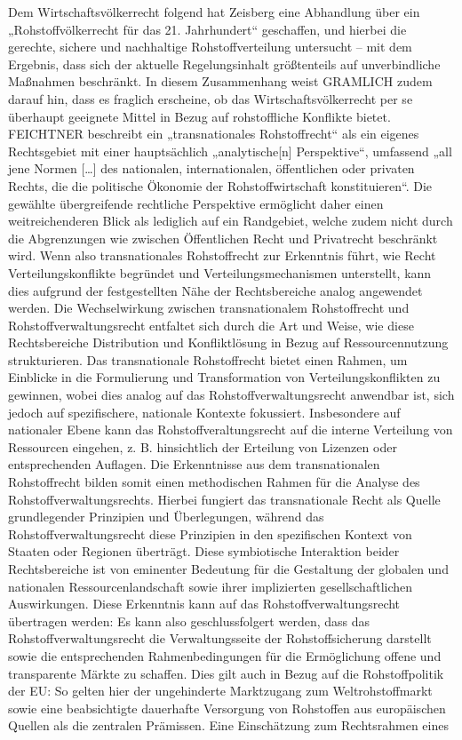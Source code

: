 \documentclass[12pt,a4paper,oneside]{book} %
\begin{document}
Dem Wirtschaftsvölkerrecht folgend hat Zeisberg eine Abhandlung über ein „Rohstoffvölkerrecht für das 21. Jahrhundert“ geschaffen,\autocite{zeisberg_rohstoffvolkerrecht_2021} und hierbei die gerechte, sichere und nachhaltige Rohstoffverteilung untersucht – mit dem Ergebnis, dass sich der aktuelle Regelungsinhalt größtenteils auf unverbindliche Maßnahmen beschränkt. In diesem Zusammenhang weist GRAMLICH zudem darauf hin, dass es fraglich erscheine, ob das Wirtschaftsvölkerrecht per se überhaupt geeignete Mittel in Bezug auf rohstoffliche Konflikte bietet.\autocite{gramlich_zeisberg_2021} FEICHTNER beschreibt ein „transnationales Rohstoffrecht“ als ein eigenes Rechtsgebiet mit einer hauptsächlich „analytische[n] Perspektive“, umfassend „all jene Normen […] des nationalen, internationalen, öffentlichen oder privaten Rechts, die die politische Ökonomie der Rohstoffwirtschaft konstituieren“.\autocite{feichtner_besonderheit_2016} Die gewählte übergreifende rechtliche Perspektive ermöglicht daher einen weitreichenderen Blick als lediglich auf ein Randgebiet, welche zudem nicht durch die Abgrenzungen wie zwischen Öffentlichen Recht und Privatrecht beschränkt wird. Wenn also transnationales Rohstoffrecht zur Erkenntnis führt, wie Recht Verteilungskonflikte begründet und Verteilungsmechanismen unterstellt,\autocite{feichtner_besonderheit_2016} kann dies aufgrund der festgestellten Nähe der Rechtsbereiche analog angewendet werden. Die Wechselwirkung zwischen transnationalem Rohstoffrecht und Rohstoffverwaltungsrecht entfaltet sich durch die Art und Weise, wie diese Rechtsbereiche Distribution und Konfliktlösung in Bezug auf Ressourcennutzung strukturieren. Das transnationale Rohstoffrecht bietet einen Rahmen, um Einblicke in die Formulierung und Transformation von Verteilungskonflikten zu gewinnen, wobei dies analog auf das Rohstoffverwaltungsrecht anwendbar ist, sich jedoch auf spezifischere, nationale Kontexte fokussiert. Insbesondere auf nationaler Ebene kann das Rohstoffveraltungsrecht auf die interne Verteilung von Ressourcen eingehen, z. B. hinsichtlich der Erteilung von Lizenzen oder entsprechenden Auflagen. Die Erkenntnisse aus dem transnationalen Rohstoffrecht bilden somit einen methodischen Rahmen für die Analyse des Rohstoffverwaltungsrechts. Hierbei fungiert das transnationale Recht als Quelle grundlegender Prinzipien und Überlegungen, während das Rohstoffverwaltungsrecht diese Prinzipien in den spezifischen Kontext von Staaten oder Regionen überträgt. Diese symbiotische Interaktion beider Rechtsbereiche ist von eminenter Bedeutung für die Gestaltung der globalen und nationalen Ressourcenlandschaft sowie ihrer implizierten gesellschaftlichen Auswirkungen. Diese Erkenntnis kann auf das Rohstoffverwaltungsrecht übertragen werden: Es kann also geschlussfolgert werden, dass das Rohstoffverwaltungsrecht die Verwaltungsseite der Rohstoffsicherung darstellt sowie die entsprechenden Rahmenbedingungen für die Ermöglichung offene und transparente Märkte zu schaffen. Dies gilt auch in Bezug auf die Rohstoffpolitik der EU: So gelten hier der ungehinderte Marktzugang zum Weltrohstoffmarkt sowie eine beabsichtigte dauerhafte Versorgung von Rohstoffen aus europäischen Quellen als die zentralen Prämissen.\autocite[4]{dauke_rohstoff-_2011} Eine Einschätzung zum Rechtsrahmen eines 
\end{document}
